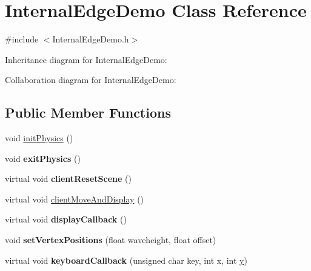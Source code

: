 \hypertarget{class_internal_edge_demo}{\section{Internal\+Edge\+Demo Class Reference}
\label{class_internal_edge_demo}
}


{\ttfamily \#include $<$Internal\+Edge\+Demo.\+h$>$}



Inheritance diagram for Internal\+Edge\+Demo\+:


Collaboration diagram for Internal\+Edge\+Demo\+:
\subsection*{Public Member Functions}
\begin{DoxyCompactItemize}
\item 
void \hyperlink{class_internal_edge_demo_a9cf089910b59a991006128af10989b38}{init\+Physics} ()
\item 
\hypertarget{class_internal_edge_demo_aa354ecaf1c1a3907f784c8d5e7804d11}{void {\bfseries exit\+Physics} ()}\label{class_internal_edge_demo_aa354ecaf1c1a3907f784c8d5e7804d11}

\item 
\hypertarget{class_internal_edge_demo_a45efdc6edb9cdad317228ff27d8f5c0e}{virtual void {\bfseries client\+Reset\+Scene} ()}\label{class_internal_edge_demo_a45efdc6edb9cdad317228ff27d8f5c0e}

\item 
virtual void \hyperlink{class_internal_edge_demo_a400025de3650f3895d7fd65f58c8756b}{client\+Move\+And\+Display} ()
\item 
\hypertarget{class_internal_edge_demo_ac0356b380f341b2b505594a7cd85acf9}{virtual void {\bfseries display\+Callback} ()}\label{class_internal_edge_demo_ac0356b380f341b2b505594a7cd85acf9}

\item 
\hypertarget{class_internal_edge_demo_a08e9ca1dc64f6a4f27935dc8d5668873}{void {\bfseries set\+Vertex\+Positions} (float waveheight, float offset)}\label{class_internal_edge_demo_a08e9ca1dc64f6a4f27935dc8d5668873}

\item 
\hypertarget{class_internal_edge_demo_ae8b040f32c3a3577a3a9d14cab0e790e}{virtual void {\bfseries keyboard\+Callback} (unsigned char key, int x, int \hyperlink{_ice_utils_8h_aa7ffaed69623192258fb8679569ff9ba}{y})}\label{class_internal_edge_demo_ae8b040f32c3a3577a3a9d14cab0e790e}

\end{DoxyCompactItemize}
